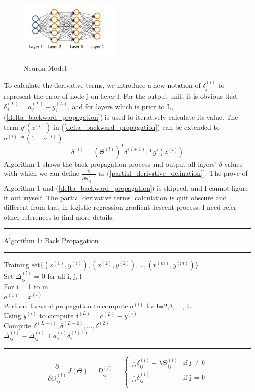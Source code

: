 \documentclass{article}
\begin{document}
\begin{figure}[ht]
  \centering
  \includegraphics[width=5cm]{Figure7.jpg}\\
  \caption{Neuron Model}\label{four_layer_neural_networks}
\end{figure}
To calculate the derivative terms, we introduce a new notation of $\delta_{j}^{(l)}$ to represent the error of node j on layer l. For the output unit, it is obvious that $\delta_{j}^{(L)} = a_{j}^{(L)} - y_{j}^{(L)}$, and for layers which is prior to L, (\ref{delta_backward_propagation}) is used to iteratively calculate its value. The term $g'(z^{(l)})$ in (\ref{delta_backward_propagation}) can be extended to $a^{(l)}.*(1-a^{(l)})$.
\begin{equation}\label{delta_backward_propagation}
\delta^{(l)} = (\Theta^{(l)})^{T}\delta^{(l+1)}.*g'(z^{(l)})
\end{equation}
Algorithm 1 shows the back propagation process and output all layers' $\delta$ values with which we can define $\frac{\partial}{\partial \Theta_{ij}^{(l)}}$ as (\ref{partial_derivative_defination}). The prove of Algorithm 1 and (\ref{delta_backward_propagation}) is skipped, and I cannot figure it out myself. The partial derivative terms' calculation is quit obscure and different from that in logistic regression gradient descent process. I need refer other references to find more details.
\smallskip
\hrule
\smallskip
Algorithm 1: Back Propagation
\smallskip
\hrule
\smallskip
Training set$\{(x^{(1)}, y^{(1)}), (x^{(2)}, y^{(2)}), $\ldots$ , (x^{(m)}, y^{(m)})\}$\\
Set $\Delta_{ij}^{(l)}$ = 0 for all i, j, l\\
For i = 1 to m\\
\indent $a^{(1)} = x^{(i)}$\\
\indent Perform forward propagation to compute $a^{(l)}$ for l=2,3, $\ldots$, L\\
\indent Using $y^{(i)}$ to compute $\delta^{(L)} = a^{(L)} - y^{(i)}$\\
\indent Compute $\delta^{(L-1)}, \delta^{(L-2)}, \ldots, \delta^{(2)}$\\
\indent $\Delta_{ij}^{(l)} = \Delta_{ij}^{(l)} + a_{j}^{(l)}\delta_{i}^{(l+1)}$\\
\hrule
\medskip
\begin{equation}\label{partial_derivative_defination}
\frac{\partial}{\partial \Theta_{ij}^{(l)}}J(\Theta) = D_{ij}^{(l)} = \left\{ \begin{array}{ll}
\frac{1}{m}\delta_{ij}^{(l)} + \lambda \Theta_{ij}^{(l)} & \textrm{if j $\neq$ 0}\\
\frac{1}{m}\delta_{ij}^{(l)} & \textrm{if j = 0}\\
\end{array} \right.
\end{equation}
\end{document}
